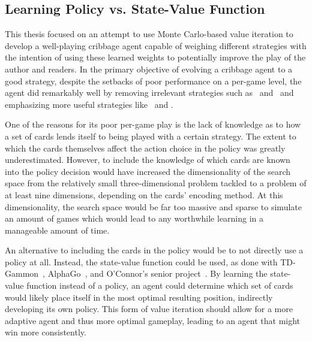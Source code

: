 
\subsection{Learning Policy vs. State-Value Function}
\label{sec:disc-value}

This thesis focused on an attempt to use Monte Carlo-based value iteration
to develop a well-playing
cribbage agent capable of weighing different strategies
with the intention of using these learned weights to 
potentially
improve the play of the author and readers.
%
In the primary objective of evolving a cribbage agent to a good strategy,
despite the setbacks of poor performance on a per-game level,
the agent did remarkably well
by removing irrelevant strategies
such as \handmaxmed\ and \peggingmaxmedgained\ 
and emphasizing more useful strategies
like \handmaxavg\ and \handmaxmin.

One of the reasons for its poor per-game play
is the lack of knowledge as to how a set of cards lends itself to being played
with a certain strategy.
%
The extent to which the cards themselves affect the action choice in the policy
was greatly underestimated.
%
However,
to include the knowledge of which cards are known into the policy decision
would have increased the dimensionality of the search space from the relatively
small three-dimensional problem tackled to a problem of at least nine
dimensions,
depending on the cards' encoding method.
%
At this dimensionality,
the search space would be far too massive and sparse to simulate an amount of
games which would lead to any worthwhile learning
in a manageable amount of time.

An alternative to including the cards in the policy would be to not
directly use a policy at all.
%
Instead,
the state-value function could be used,
as done with TD-Gammon~\cite{tdgammon},
AlphaGo~\cite{deepmind_alphago,deepmind_alphago_zero},
and O'Connor's senior project~\cite{roconnor_cs486}.
%
By learning the state-value function instead of a policy,
an agent could determine which set of cards would likely place itself in the
most optimal resulting position,
indirectly developing its own policy.
%
This form of value iteration should allow for a more adaptive agent
and thus more optimal gameplay,
leading to an agent that might win more consistently.

%
